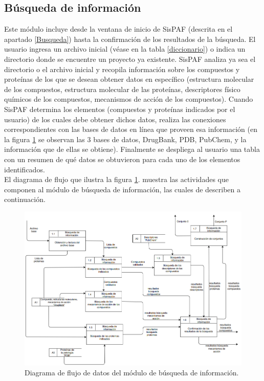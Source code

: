 \subsection{Búsqueda de información}
\noindent Este módulo incluye desde la ventana de inicio de SisPAF (descrita en el apartado \ref{Busqueda}) hasta la confirmación de los resultados de la búsqueda. El usuario ingresa un archivo inicial (véase en la tabla \ref{diccionario}) o indica un directorio donde se encuentre un proyecto ya existente.  SisPAF analiza ya sea el directorio o el archivo inicial y recopila información sobre los compuestos y proteínas de los que se desean obtener datos en específico (estructura molecular de los compuestos, estructura molecular de las proteínas, descriptores físico químicos de los compuestos, mecanismos de acción de los compuestos). Cuando SisPAF determina los elementos (compuestos y proteínas indicados por el usuario) de los cuales debe obtener dichos datos, realiza las conexiones correspondientes con las bases de datos en línea que proveen esa información (en la figura \ref{DFD1} se observan las 3 bases de datos, DrugBank, PDB,  PubChem, y la información que de ellas se obtiene). Finalmente se despliega al usuario una tabla con un resumen de qué datos se obtuvieron para cada uno de los elementos identificados.\\

\noindent El diagrama de flujo que ilustra la figura \ref{DFD1}. muestra las actividades que componen al módulo de búsqueda de información, las cuales de describen a continuación.

\begin{figure}[H]
    \centering
    \includegraphics[scale=0.46]{Capitulo2/images/DFD-1.png}
    \caption{Diagrama de flujo de datos del módulo de búsqueda de información.}
    \label{DFD1}
\end{figure}
